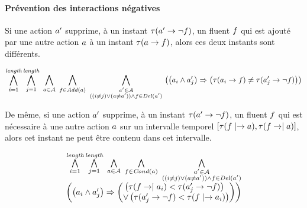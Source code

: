 \paragraph*{Prévention des interactions négatives}

Si une action $a'$ supprime, à un instant $\tau(a'\rightarrow\neg f)$, un fluent $f$ qui est ajouté par une autre action $a$ à un instant $\tau(a\rightarrow f)$, alors ces deux instants sont différents.

\begin{small}
\[
\BigforallTwo{i=1}{\length}\BigforallTwo{j=1}{\length}%
~\Bigforall{\substack{\a\in \A}}~\Bigforall{\substack{\f\in \add{\a}}}~\Bigforall{\substack{\b\in \A\\((i \neq j) \vee (\a \neq \b)) \wedge \f \in \del{\b}}}\hfill\\
\left(\left(\a_{i} \wedge \b_{j}\right) \Rightarrow %
\left(\tau(\a_{i}\rightarrow \f) \neq \tau(\b_{j}\rightarrow \neg \f)\right)%
\right)%
\]
\end{small}

De même, si une action $a'$ supprime, à un instant $\tau(a'\rightarrow\neg f)$, un fluent $f$ qui est nécessaire à une autre action $a$ sur un intervalle temporel $[\tau(f\mid\rightarrow a), \tau(f\rightarrow\mid a)]$, alors cet instant ne peut être contenu dans cet intervalle.

\begin{small}
\[
\begin{matrix}
\BigforallTwo{i=1}{\length}\BigforallTwo{j=1}{\length}%
~\Bigforall{\substack{\a\in \A}}~\Bigforall{\substack{\f\in \cond{\a}}}~\Bigforall{\substack{\b\in \A\\((i \neq j) \vee (\a \neq \b)) \wedge \f \in \del{\b}}}\hfill\\
\left(\left(\a_{i} \wedge \b_{j}\right) \Rightarrow \begin{pmatrix}\left(\tau(\f\rightarrow\mid\a_{i}) < \tau(\b_{j}\rightarrow \neg \f)\right)\hfill\\
 \vee \left(\tau(\b_{j}\rightarrow \neg \f) < \tau(\f\mid\rightarrow\a_{i})\right)\end{pmatrix}\right)%
\end{matrix}
\]
\end{small}


